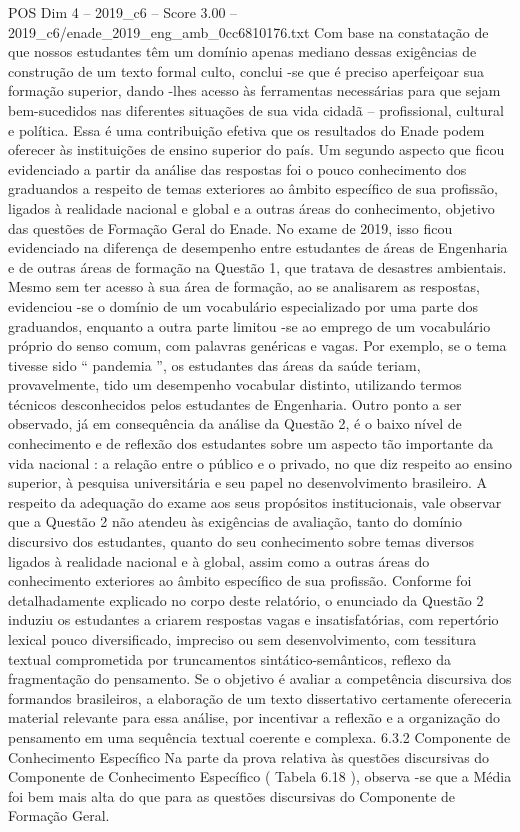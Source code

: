 \begin{textsample}{POS Dim 4 – 2019\_c6 – Score 3.00 – 2019\_c6/enade\_2019\_eng\_amb\_0cc6810176.txt}
Com base na constatação de que nossos estudantes têm um domínio apenas mediano dessas exigências de construção de um texto formal culto, conclui -se que é preciso aperfeiçoar sua formação superior, dando -lhes acesso às ferramentas necessárias para que sejam bem-sucedidos nas diferentes situações de sua vida cidadã – profissional, cultural e política.
Essa é uma contribuição efetiva que os resultados do Enade podem oferecer às instituições de ensino superior do país.
Um segundo aspecto que ficou evidenciado a partir da análise das respostas foi o pouco conhecimento dos graduandos a respeito de temas exteriores ao âmbito específico de sua profissão, ligados à realidade nacional e global e a outras áreas do conhecimento, objetivo das questões de Formação Geral do Enade.
No exame de 2019, isso ficou evidenciado na diferença de desempenho entre estudantes de áreas de Engenharia e de outras áreas de formação na Questão 1, que tratava de desastres ambientais.
Mesmo sem ter acesso à sua área de formação, ao se analisarem as respostas, evidenciou -se o domínio de um vocabulário especializado por uma parte dos graduandos, enquanto a outra parte limitou -se ao emprego de um vocabulário próprio do senso comum, com palavras genéricas e vagas.
Por exemplo, se o tema tivesse sido “ pandemia ”, os estudantes das áreas da saúde teriam, provavelmente, tido um desempenho vocabular distinto, utilizando termos técnicos desconhecidos pelos estudantes de Engenharia.
Outro ponto a ser observado, já em consequência da análise da Questão 2, é o baixo nível de conhecimento e de reflexão dos estudantes sobre um aspecto tão importante da vida nacional : a relação entre o público e o privado, no que diz respeito ao ensino superior, à pesquisa universitária e seu papel no desenvolvimento brasileiro.
A respeito da adequação do exame aos seus propósitos institucionais, vale observar que a Questão 2 não atendeu às exigências de avaliação, tanto do domínio discursivo dos estudantes, quanto do seu conhecimento sobre temas diversos ligados à realidade nacional e à global, assim como a outras áreas do conhecimento exteriores ao âmbito específico de sua profissão.
Conforme foi detalhadamente explicado no corpo deste relatório, o enunciado da Questão 2 induziu os estudantes a criarem respostas vagas e insatisfatórias, com repertório lexical pouco diversificado, impreciso ou sem desenvolvimento, com tessitura textual comprometida por truncamentos sintático-semânticos, reflexo da fragmentação do pensamento.
Se o objetivo é avaliar a competência discursiva dos formandos brasileiros, a elaboração de um texto dissertativo certamente ofereceria material relevante para essa análise, por incentivar a reflexão e a organização do pensamento em uma sequência textual coerente e complexa. 6.3.2 Componente de Conhecimento Específico Na parte da prova relativa às questões discursivas do Componente de Conhecimento Específico ( Tabela 6.18 ), observa -se que a Média foi bem mais alta do que para as questões discursivas do Componente de Formação Geral.

\end{textsample}
